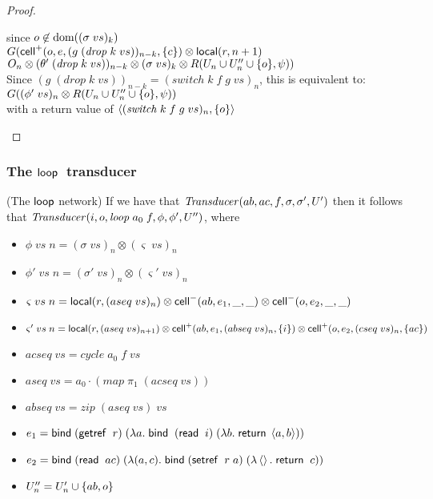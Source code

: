 \begin{proof}
\begin{enumerate}
\begin{tabbedproof}
  \ooooo since $o \not\in \mbox{dom}({(\sigma\;vs)_k})$ \\
  \ooooo $G(\mathsf{cell}^{+}({o}, {e}, {(g\;(\mathit{drop}\;k\;vs))_{n-k}}, {\{{c}\}}) \otimes \mathsf{local}({r}, {n+1})$ \\
  \oooooo $O_n \otimes (\theta'\;(\mathit{drop}\;k\;vs))_{n-k} \otimes (\sigma\;vs)_k \otimes R(U_n \cup U''_n \cup \{{o}\}, \psi))$ \\ 
  \oooo Since $(g\;(\mathit{drop}\;k\;vs))_{n-k} = (\mathit{switch}\;k\;f\;g\;vs)_n$, this is equivalent to:\\
  \ooooo $G((\phi'\;vs)_n \otimes R(U_n \cup U''_n \cup \{{o}\}, \psi))$ \\
  \oooo with a return value of $\left<{(\mathit{switch}\;k\;f\;g\;vs)_n},{\{{o}\}}\right>$ \\ 
  \end{tabbedproof}
\end{enumerate}
\end{proof}



\subsubsection{The $\mathsf{loop}\;$ transducer}
\begin{lemma}{(The $\mathsf{loop}$ network)}
If we have that $\mathit{Transducer}(ab, ac, f, \sigma, \sigma', U')$ 
then it follows that $\mathit{Transducer}(i, o, \mathit{loop}\;a_0\;f, \phi, \phi', U'')$, where 

\begin{itemize}
\item $\phi\;vs\;n = (\sigma\;vs)_n \otimes (\varsigma\;vs)_n $
\item $\phi'\;vs\;n = (\sigma'\;vs)_n \otimes (\varsigma'\;vs)_n$
\item $\varsigma\;vs\;n = \mathsf{local}({r}, {(aseq\;vs)_n}) \otimes \mathsf{cell}^{-}({ab}, {e_1}, {\_}, {\_}) \otimes \mathsf{cell}^{-}({o}, {e_2}, {\_}, {\_})$ 
\item $\varsigma'\;vs\;n = {\small \mathsf{local}({r}, {(aseq\;vs)_{n+1}}) \otimes \mathsf{cell}^{+}({ab}, {e_1}, {(abseq\;vs)_n}, {\{{i}\}}) \otimes \mathsf{cell}^{+}({o}, {e_2}, {(cseq\;vs)_n}, {\{{ac}\}})}$ 
\item $acseq\;vs = \mathit{cycle}\;a_0\;f\;vs$
\item $aseq\;vs = a_0 \cdot (\mathit{map}\;\pi_1\;(acseq\;vs))$
\item $abseq\;vs = \mathit{zip}\;(aseq\;vs)\;vs$
\item $e_1 = \mathsf{bind}\; (\mathsf{getref}\;\;r)\;(\lambda a.\;\mathsf{bind}\;\;(\mathsf{read}\;\;i)\; (\lambda b.\;\mathsf{return}\;\left<{a},{b}\right>))$
\item $e_2 = \mathsf{bind}\; (\mathsf{read}\;\;ac)\;(\lambda (a,c).\;\mathsf{bind}\; (\mathsf{setref}\;\;r\;a)\; (\lambda \left<\right>.\;\mathsf{return}\;\;c))$
\item $U''_n = U'_n \cup \{{ab,o}\}$
\end{itemize}
\end{lemma}

